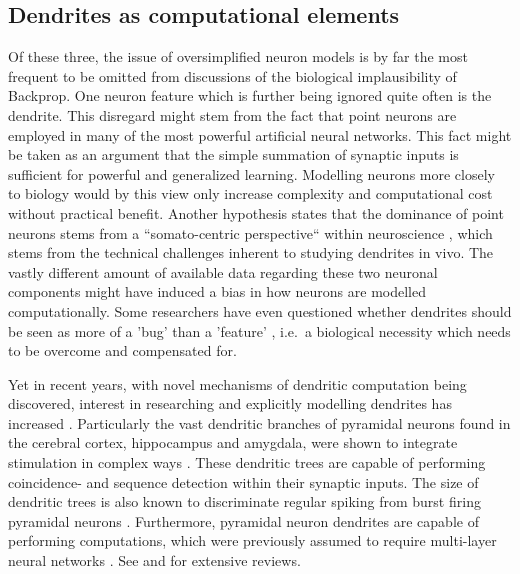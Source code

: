 \subsection{Dendrites as computational elements}\label{sec-dendrites}

Of these three, the issue of oversimplified neuron models is by far the most frequent to be omitted from discussions of
the biological implausibility of Backprop. One neuron feature which is further being ignored quite often is the
dendrite. This disregard might stem from the fact that point neurons are employed in many of the most powerful
artificial neural networks. This fact might be taken as an argument that the simple summation of synaptic inputs is
sufficient for powerful and generalized learning. Modelling neurons more closely to biology would by this view only
increase complexity and computational cost without practical benefit. Another hypothesis states that the dominance of
point neurons stems from a ``somato-centric perspective`` within neuroscience \citep{Larkum2018}, which stems from the
technical challenges inherent to studying dendrites in vivo. The vastly different amount of available data regarding
these two neuronal components might have induced a bias in how neurons are modelled computationally. Some researchers
have even questioned whether dendrites should be seen as more of a 'bug' than a 'feature' \citep{Haeusser2003}, i.e.\ a
biological necessity which needs to be overcome and compensated for.

Yet in recent years, with novel mechanisms of dendritic computation being discovered, interest in researching and
explicitly modelling dendrites has increased \citep{Richards2019,guerguiev2017towards}. Particularly the vast dendritic
branches of pyramidal neurons found in the cerebral cortex, hippocampus and amygdala, were shown to integrate
stimulation in complex ways \citep{spruston2008pyramidal}. These dendritic trees are capable of performing coincidence-
\citep{Larkum1999} and sequence detection \citep{Branco2010} within their synaptic inputs. The size of dendritic trees
is also known to discriminate regular spiking from burst firing pyramidal neurons \citep{Elburg2010}. Furthermore,
pyramidal neuron dendrites are capable of performing computations, which were previously assumed to require multi-layer
neural networks \citep{Schiess2016,Gidon2020}. See \citep{Larkum2022} and \citep{Poirazi2020} for extensive reviews.


